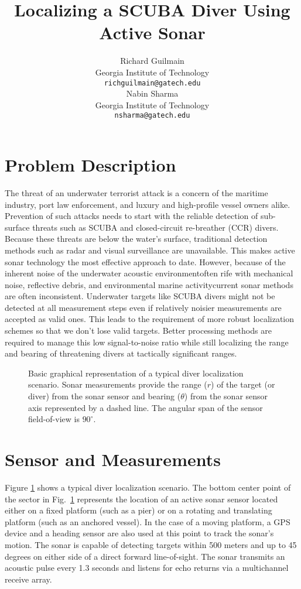 \documentclass{article} %
\title{Localizing a SCUBA Diver Using Active Sonar}
\author{
Richard Guilmain \\
Georgia Institute of Technology\\
\texttt{richguilmain@gatech.edu} \\
\And
Nabin Sharma \\
Georgia Institute of Technology\\
\texttt{nsharma@gatech.edu} \\
}
\begin{document}
\maketitle


\section{Problem Description}
The threat of an underwater terrorist attack is a concern of the maritime industry, port law enforcement, and luxury and high-profile vessel owners alike. Prevention of such attacks needs to start with the reliable detection of sub-surface threats such as SCUBA and closed-circuit re-breather (CCR) divers. Because these threats are below the water's surface, traditional detection methods such as radar and visual surveillance are unavailable. This makes active sonar technology the most effective approach to date. However, because of the inherent noise of the underwater acoustic environment\textemdash often rife with mechanical noise, reflective debris, and environmental marine activity\textemdash current sonar methods are often inconsistent. Underwater targets like SCUBA divers might not be detected at all measurement steps even if relatively noisier measurements are accepted as valid ones. This leads to the requirement of more robust localization schemes so that we don't lose valid targets. Better processing methods are required to manage this low signal-to-noise ratio while still localizing the range and bearing of threatening divers at tactically significant ranges.

\begin{figure}[htbp]
  \centering
  \caption{Basic graphical representation of a typical diver localization scenario. Sonar
    measurements provide the range ($r$) of the target (or diver) from the sonar sensor and
    bearing ($\theta$) from the sonar sensor axis represented by a dashed line. The angular
    span of the sensor field-of-view is $90^{\circ}$.}
  \label{fig:sector}
\end{figure}

\section{Sensor and Measurements}
Figure \ref{fig:sector} shows a typical diver localization scenario. The bottom center point of the sector in Fig.~\ref{fig:sector} represents the location of an active sonar sensor located either on a fixed platform (such as a pier) or on a rotating and translating platform (such as an anchored vessel). In the case of a moving platform, a GPS device and a heading sensor are also used at this point to track the sonar's motion.
The sonar is capable of detecting targets within 500 meters and up to 45 degrees on either side of a direct forward line-of-sight. The sonar transmits an acoustic pulse every 1.3 seconds and listens for echo returns via a multichannel receive array.
\end{document}
